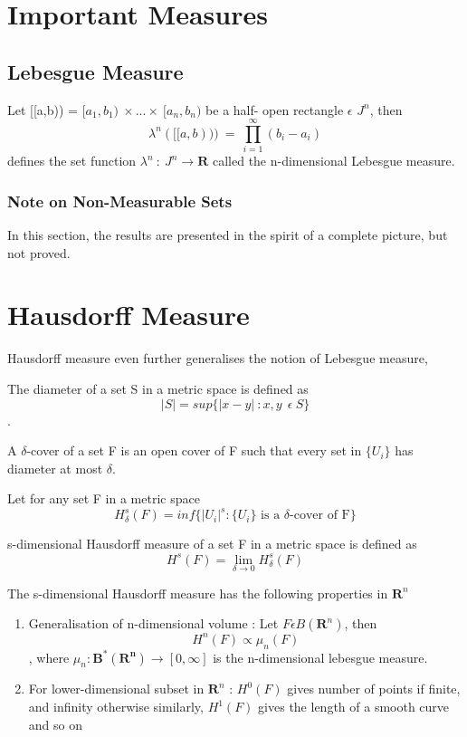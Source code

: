 \section{Important Measures}
\subsection{Lebesgue Measure}
\begin{definition}
    Let [[a,b)) = $[a_1,b_1) \: \times...\times \: [a_n,b_n)$ be a half- open
    rectangle $\epsilon$ $J^n$, then
    \[
        \lambda^n([[a,b))) \: = \: \prod_{i=1}^{\infty}(b_i - a_i)
    \]
        defines the set function $\lambda^n \: : \: J^n \rightarrow \bm{R}$
        called the n-dimensional Lebesgue measure.
\end{definition}

\subsubsection{Note on Non-Measurable Sets}
In this section, the results are presented in the spirit of a complete picture,
but not proved.


\section{Hausdorff Measure}
Hausdorff measure even further generalises the notion of Lebesgue measure,
\begin{definition}
    The diameter of a set S in a metric space is defined as
    \[
        |S| = sup\{|x-y| \: : x,y \:  \: \epsilon \: S \}
    \]
    .
\end{definition}
\begin{definition}
    A $\delta$-cover of a set F is an open cover of F such that every set in
    $\{U_i\}$ has diameter at most $\delta$.
\end{definition}
Let for any set F in a metric space
\[
    H_\delta^s(F) = inf\{|U_i|^s : \{U_i\} \text{ is a $\delta$-cover of F} \}
\]
\begin{definition}
    s-dimensional Hausdorff measure of a set F in a metric space is defined as
    \[
        H^s(F) = \lim_{\delta \to 0} H_\delta^s(F)
    \]
\end{definition}
\begin{theorem}
    The s-dimensional Hausdorff measure has the following properties in
    $\bm{R}^n$
    \begin{enumerate}
        \item Generalisation of n-dimensional volume : Let $F \epsilon
            B(\bm{R}^n)$, then
            \[
                H^n(F) \propto \mu_n(F)
            \]
            , where $\mu_n : \bm{B^*(R^n)} \to [0, \infty]$ is the n-dimensional lebesgue
            measure.
        \item For lower-dimensional subset in $\bm{R}^n$ : $H^0(F)$ gives number
            of points if finite, and infinity otherwise
            \newline similarly, $H^1(F)$ gives the length of a smooth curve
            \newline and so on
    \end{enumerate}
\end{theorem}

